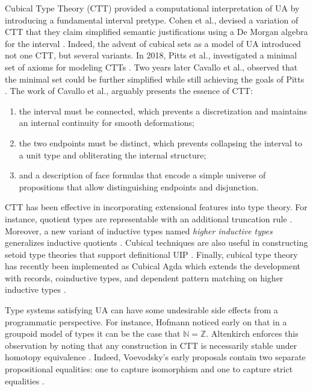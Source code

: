 Cubical Type Theory (CTT) provided a computational interpretation of UA by introducing a fundamental interval pretype.
Cohen et al., devised a variation of CTT that they claim simplified semantic justifications using a De Morgan algebra for the interval \cite{cohen2016}.
Indeed, the advent of cubical sets as a model of UA introduced not one CTT, but several variants.
In 2018, Pitts et al., investigated a minimal set of axioms for modeling CTTs \cite{pitts2018}.
Two years later Cavallo et al., observed that the minimal set could be further simplified while still achieving the goals of Pitts \cite{cavallo2020}.
The work of Cavallo et al., arguably presents the essence of CTT:
\begin{enumerate}
    \item {
        the interval must be connected, which prevents a discretization and maintains an internal continuity for smooth deformations;
    }
    \item {
        the two endpoints must be distinct, which prevents collapsing the interval to a unit type and obliterating the internal structure;
    }
    \item {
        and a description of face formulas that encode a simple universe of propositions that allow distinguishing endpoints and disjunction.
    }
\end{enumerate}
CTT has been effective in incorporating extensional features into type theory.
For instance, quotient types are representable with an additional truncation rule \cite{kraus2020}.
Moreover, a new variant of inductive types named \textit{higher inductive types} generalizes inductive quotients \cite{angiuli2017}.
Cubical techniques are also useful in constructing setoid type theories that support definitional UIP \cite{sterling2020}.
Finally, cubical type theory has recently been implemented as Cubical Agda which extends the development with records, coinductive types, and dependent pattern matching on higher inductive types \cite{vezzosi2021}.

Type systems satisfying UA can have some undesirable side effects from a programmatic perspective.
For instance, Hofmann noticed early on that in a groupoid model of types it can be the case that $\mathbb{N} = \mathbb{Z}$.
Altenkirch enforces this observation by noting that any construction in CTT is necessarily stable under homotopy equivalence \cite{altenkirch2016}.
Indeed, Voevodsky's early proposals contain two separate propositional equalities: one to capture isomorphism and one to capture strict equalities \cite{voevodsky2013}.

